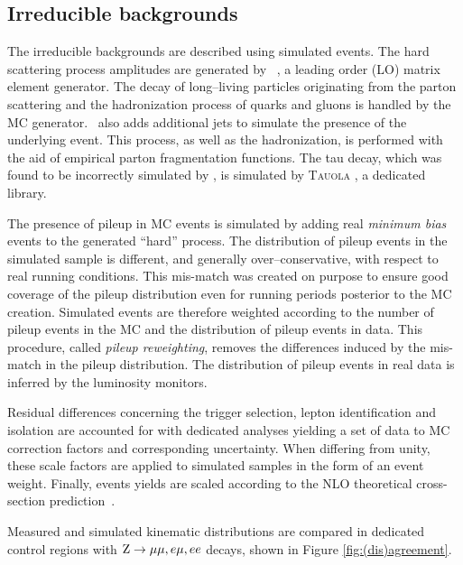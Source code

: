 \subsection{Irreducible backgrounds}

The irreducible backgrounds are described using simulated events. The hard scattering process amplitudes are generated by \madgraph\ \cite{MG4}, a leading order (LO) matrix element generator. The decay of long--living particles originating from the parton scattering and the hadronization process of quarks and gluons is handled by the \pythia\ \cite{pythia} MC generator. \pythia\ also adds additional jets to simulate the presence of the underlying event. This process, as well as the hadronization, is performed with the aid of empirical parton fragmentation functions. The tau decay, which was found to be incorrectly simulated by \pythia, is simulated by \textsc{Tauola} \cite{tauola}, a dedicated library. 

The presence of pileup in MC events is simulated by adding real \emph{minimum bias} events to the generated ``hard'' process. The distribution of pileup events in the simulated sample is different, and generally over--conservative, with respect to real running conditions. 
This mis-match was created on purpose to ensure good coverage of the pileup distribution even for running periods posterior to the MC creation.
Simulated events are therefore weighted according to the number of pileup events in the MC and the distribution of pileup events in data. This procedure, called \emph{pileup reweighting}, removes the differences induced by the mis-match in the pileup distribution. The distribution of pileup events in real data is inferred by the luminosity monitors.

Residual differences concerning the trigger selection, lepton identification and isolation are accounted for with dedicated analyses yielding a set of data to MC correction factors and corresponding uncertainty. When differing from unity, these scale factors are applied to simulated samples in the form of an event weight.
Finally, events yields are scaled according to the NLO theoretical cross-section prediction~\cite{MCFM}. 

Measured and simulated kinematic distributions are compared in dedicated control regions with $\mathrm{Z}\rightarrow\mu\mu,e\mu,ee$ decays, shown in Figure \ref{fig:(dis)agreement}. %

